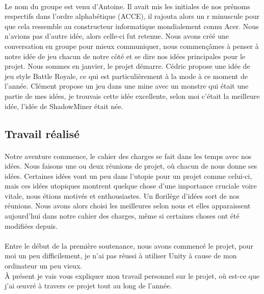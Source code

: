 \documentclass[titlepage, 13px, a4paper]{report}
\begin{document}
\paragraph{} \hspace{0pt}
Le nom du groupe est venu d'Antoine. Il avait mis les initiales de nos 
prénoms respectifs dans l’ordre alphabétique (ACCE), il rajouta alors un r minuscule pour 
que cela ressemble au constructeur informatique mondialement connu Acer. Nous n’avions pas 
d’autre idée, alors celle-ci fut retenue. Nous avons créé une conversation en groupe pour 
mieux communiquer, nous commençâmes à penser à notre idée de jeu chacun de notre côté et 
se dire nos idées principales pour le projet. Nous sommes en janvier, le projet démarre. 
Cédric propose une idée de jeu style Battle Royale, ce qui est particulièrement à la mode 
à ce moment de l’année. Clément propose un jeu dans une mine avec un monstre qui était une 
partie de mes idées, je trouvais cette idée excellente, selon moi c’était la meilleure idée, 
l’idée de ShadowMiner était née. \\

\subsection{Travail réalisé}

\paragraph{} \hspace{0pt}
Notre aventure commence, le cahier des charges se fait dans les temps avec nos idées. Nous faisons une 
ou deux réunions de projet, où chacun de nous donne ses idées. Certaines idées vont un peu dans l'utopie 
pour un projet comme celui-ci, mais ces idées utopiques montrent quelque chose d'une importance cruciale 
voire vitale, nous étions motivés et enthousiastes. Un florilège d'idées sort de nos réunions. Nous avons 
alors choisi les meilleures selon nous et elles apparaissent aujourd'hui dans notre cahier des charges, 
même si certaines choses ont été modifiées depuis.  \\


\paragraph{} \hspace{0pt}
Entre le début de la première soutenance, nous avons commencé le projet, pour moi un peu difficilement, 
je n'ai pas réussi à utiliser Unity à cause de mon ordinateur un peu vieux. \\
À présent je vais vous expliquer mon travail 
personnel sur le projet, où est-ce que j’ai œuvré à travers ce projet tout au long de l’année. \\
\end{document}
